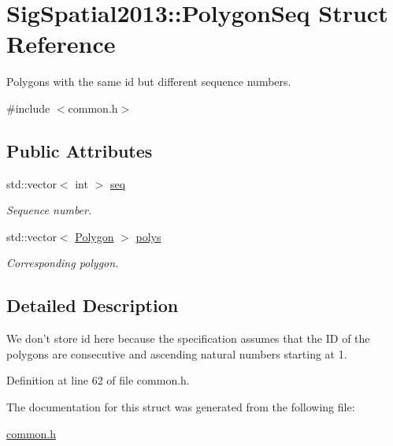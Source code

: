 \hypertarget{structSigSpatial2013_1_1PolygonSeq}{\section{Sig\-Spatial2013\-:\-:Polygon\-Seq Struct Reference}
\label{structSigSpatial2013_1_1PolygonSeq}
}


Polygons with the same id but different sequence numbers.  




{\ttfamily \#include $<$common.\-h$>$}

\subsection*{Public Attributes}
\begin{DoxyCompactItemize}
\item 
\hypertarget{structSigSpatial2013_1_1PolygonSeq_a8e5886e2fe69a1a7078ee74bccae89c9}{std\-::vector$<$ int $>$ \hyperlink{structSigSpatial2013_1_1PolygonSeq_a8e5886e2fe69a1a7078ee74bccae89c9}{seq}}\label{structSigSpatial2013_1_1PolygonSeq_a8e5886e2fe69a1a7078ee74bccae89c9}

\begin{DoxyCompactList}\small\item\em Sequence number. \end{DoxyCompactList}\item 
\hypertarget{structSigSpatial2013_1_1PolygonSeq_aeba1c2ff52d1f1287f5ad1995bfba151}{std\-::vector$<$ \hyperlink{structSigSpatial2013_1_1Polygon}{Polygon} $>$ \hyperlink{structSigSpatial2013_1_1PolygonSeq_aeba1c2ff52d1f1287f5ad1995bfba151}{polys}}\label{structSigSpatial2013_1_1PolygonSeq_aeba1c2ff52d1f1287f5ad1995bfba151}

\begin{DoxyCompactList}\small\item\em Corresponding polygon. \end{DoxyCompactList}\end{DoxyCompactItemize}


\subsection{Detailed Description}
We don't store id here because the specification assumes that the I\-D of the polygons are consecutive and ascending natural numbers starting at 1. 

Definition at line 62 of file common.\-h.



The documentation for this struct was generated from the following file\-:\begin{DoxyCompactItemize}
\item 
\hyperlink{common_8h}{common.\-h}\end{DoxyCompactItemize}
